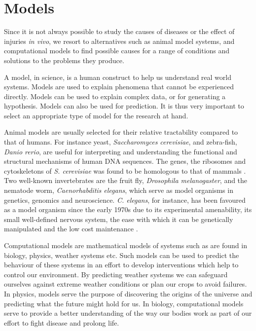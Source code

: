 \section{Models}
Since it is not always possible to study the causes of diseases or the effect of injuries \textit{in vivo}, we resort to alternatives such as animal model systems, and computational models to find possible causes for a range of conditions and solutions to the problems they produce.

A model, in science, is a human construct to help us understand real world systems. Models are used to explain phenomena that cannot be experienced directly. Models can be used to explain complex data, or for generating a hypothesis. Models can also be used for prediction. It is thus very important to select an appropriate type of model for the research at hand.

Animal models are usually selected for their relative tractability compared to that of humans. For instance yeast, \textit{Saccharomyces cerevisiae}, and zebra-fish, \textit{Danio rerio}, are useful for interpreting and understanding the functional and structural mechanisms of human DNA sequences. The genes, the ribosomes and cytoskeletons of \textit{S. cerevisiae} was found to be homologous to that of mammals \cite{Botstein1997, Dooley2000}. Two well-known invertebrates are the fruit fly, \textit{Drosophila melanogaster}, and the nematode worm, \textit{Caenorhabditis elegans}, which serve as model organisms in genetics, genomics and neuroscience. \textit{C. elegans}, for instance, has been favoured as a model organism since the early 1970s due to its experimental amenability, its small well-defined nervous system, the ease with which it can be genetically manipulated and the low cost maintenance \cite{Sengupta2009}.

Computational models are mathematical models of systems such as are found in biology, physics, weather systems etc. Such models can be used to predict the behaviour of these systems in an effort to develop interventions which help to control our environment. By predicting weather systems we can safeguard ourselves against extreme weather conditions or plan our crops to avoid failures. In physics, models serve the purpose of discovering the origins of the universe and predicting what the future might hold for us. In biology, computational models serve to provide a better understanding of the way our bodies work as part of our effort to fight disease and prolong life.

